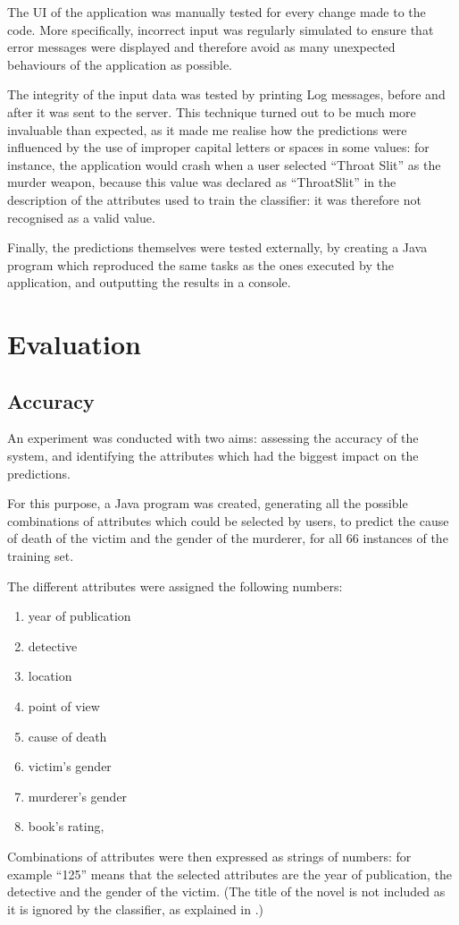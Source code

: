 \documentclass{mproj}
\begin{document}
The UI of the application was manually tested for every change made to the code. More specifically, incorrect input was regularly simulated to ensure that error messages were displayed and therefore avoid as many unexpected behaviours of the application as possible.

The integrity of the input data was tested by printing Log messages, before and after it was sent to the server. This technique turned out to be much more invaluable than expected, as it made me realise how the predictions were influenced by the use of improper capital letters or spaces in some values: for instance, the application would crash when a user selected ``Throat Slit'' as the murder weapon, because this value was declared as ``ThroatSlit'' in the description of the attributes used to train the classifier: it was therefore not recognised as a valid value. 

Finally, the predictions themselves were tested externally, by creating a Java program which reproduced the same tasks as the ones executed by the application, and outputting the results in a console. 

\chapter{Evaluation}\label{evaluation}

\section{Accuracy}

An experiment was conducted with two aims: assessing the accuracy of the system, and identifying the attributes which had the biggest impact on the predictions. 

For this purpose, a Java program was created, generating all the possible combinations of attributes which could be selected by users, to predict the cause of death of the victim and the gender of the murderer, for all 66 instances of the training set.

The different attributes were assigned the following numbers:
\begin{enumerate}[topsep=0pt]
	\item year of publication
	\item detective
	\item location
	\item point of view
	\item cause of death
	\item victim's gender
	\item murderer's gender
	\item book's rating,
\end{enumerate}
Combinations of attributes were then expressed as strings of numbers: for example ``125'' means that the selected attributes are the year of publication, the detective and the gender of the victim. (The title of the novel is not included as it is ignored by the classifier, as explained in .)
\end{document}
